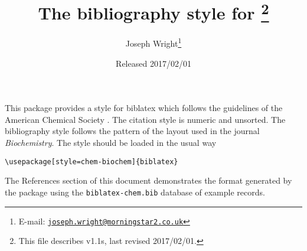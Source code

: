 \documentclass[a4paper]{ltxdoc}
\author{Joseph Wright\thanks{E-mail: 
  \href{mailto:joseph.wright@morningstar2.co.uk}
  {\texttt{joseph.wright@morningstar2.co.uk}}}}
\title{The \pkg{chem-biochem} bibliography style for \pkg{biblatex}%
  \footnote{This file describes v1.1s, last revised 2017/02/01.}}
\date{Released 2017/02/01}
\providecommand*{\pkg}[1]{\textsf{#1}}
\begin{document}
\maketitle

This package provides a style for \pkg{biblatex} which follows the
guidelines of the American Chemical Society \autocite{Coghill2006}.
The citation style is numeric
and unsorted. The bibliography style follows the pattern of the layout
used in the journal \emph{Biochemistry}. The
style should be loaded in the usual way
\begin{verbatim}
\usepackage[style=chem-biochem]{biblatex}
\end{verbatim}
The References section of this document demonstrates the format 
generated by the package using the \texttt{biblatex-chem.bib} database
of example records.

\nocite{*}

\printbibliography
\end{document}
